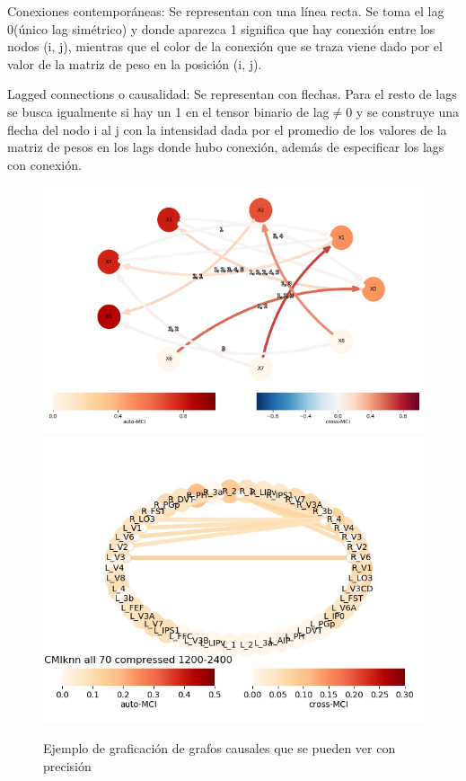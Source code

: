 \documentclass[a4paper,10pt,twocolumn]{article}
\begin{document}
\begin{description}


\item	Conexiones contemporáneas: Se representan con una línea recta. Se toma el lag 0(único lag simétrico) y donde aparezca 1 significa que hay conexión entre los nodos (i, j), mientras que el color de la conexión que se traza viene dado por el valor de la matriz de peso en la posición (i, j).\\

\item	Lagged connections o causalidad: Se representan con flechas. Para el resto de lags se busca igualmente si hay un 1 en el tensor binario de 
lag$\neq $0 y se construye una flecha del nodo i al j con la intensidad dada por el promedio de los valores de la matriz de pesos en los lags donde hubo conexión, además de especificar los lags con conexión.\\

\end{description}

\begin{figure}[h!]%
\center
\includegraphics[scale=0.95]{example1.png}
\includegraphics[scale=0.45]{example.png}
\caption{Ejemplo de graficación de grafos causales que se pueden ver con precisión}
\end{figure}
\end{document}
